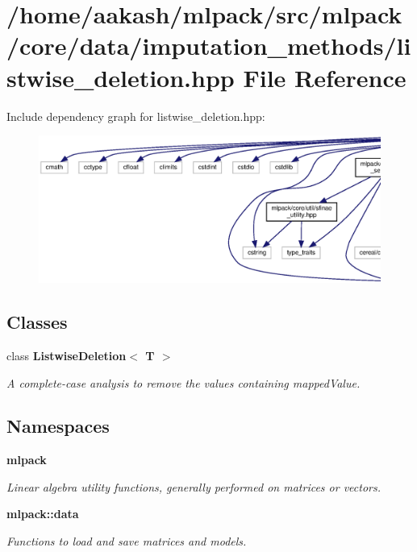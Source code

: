 \section{/home/aakash/mlpack/src/mlpack/core/data/imputation\+\_\+methods/listwise\+\_\+deletion.hpp File Reference}
\label{listwise__deletion_8hpp}
Include dependency graph for listwise\+\_\+deletion.\+hpp\+:
\nopagebreak
\begin{figure}[H]
\begin{center}
\leavevmode
\includegraphics[width=350pt]{listwise__deletion_8hpp__incl}
\end{center}
\end{figure}
\subsection*{Classes}
\begin{DoxyCompactItemize}
\item 
class \textbf{ Listwise\+Deletion$<$ T $>$}
\begin{DoxyCompactList}\small\item\em A complete-\/case analysis to remove the values containing mapped\+Value. \end{DoxyCompactList}\end{DoxyCompactItemize}
\subsection*{Namespaces}
\begin{DoxyCompactItemize}
\item 
 \textbf{ mlpack}
\begin{DoxyCompactList}\small\item\em Linear algebra utility functions, generally performed on matrices or vectors. \end{DoxyCompactList}\item 
 \textbf{ mlpack\+::data}
\begin{DoxyCompactList}\small\item\em Functions to load and save matrices and models. \end{DoxyCompactList}\end{DoxyCompactItemize}


